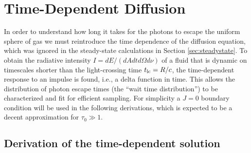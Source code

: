 \documentclass{aastex63}
\begin{document}
\section{Time-Dependent Diffusion}
\label{sec:time_dependent}

In order to understand how long it takes for the photons to escape the uniform sphere of gas we must reintroduce the time dependence of the diffusion equation, which was ignored in the steady-state calculations in Section \ref{sec:steadystate}. To obtain the radiative intensity $I=dE/(dAdtd\Omega d\nu)$ of a fluid that is dynamic on timescales shorter than the light-crossing time $t_{\rm lc} = R/c$, the time-dependent response to an impulse is found, i.e., a delta function in time. This allows the distribution of photon escape times (the ``wait time distribution'') to be characterized and fit for efficient sampling. For simplicity a $J=0$ boundary condition will be used in the following derivations, which is expected to be a decent approximation for $\tau_0 \gg 1$. 

\subsection{Derivation of the time-dependent solution}
\label{subsec:time_dependent:background}
\end{document}
